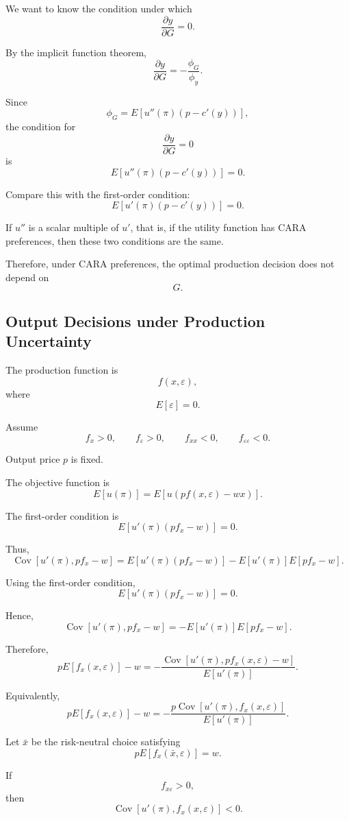 We want to know the condition under which
\[
\frac{\partial y}{\partial G}=0.
\]

By the implicit function theorem,
\[
\frac{\partial y}{\partial G}
=
-
\frac{\phi_G}{\phi_y}.
\]

Since
\[
\phi_G
=
E[u''(\pi)(p-c'(y))],
\]
the condition for
\[
\frac{\partial y}{\partial G}=0
\]
is
\[
E[u''(\pi)(p-c'(y))]=0.
\]

Compare this with the first-order condition:
\[
E[u'(\pi)(p-c'(y))]=0.
\]

If \(u''\) is a scalar multiple of \(u'\), that is, if the utility function has CARA preferences, then these two conditions are the same.

Therefore, under CARA preferences, the optimal production decision does not depend on
\[
G.
\]

\subsection{Output Decisions under Production Uncertainty}

The production function is
\[
f(x,\varepsilon),
\]
where
\[
E[\varepsilon]=0.
\]

Assume
\[
f_x>0,
\qquad
f_{\varepsilon}>0,
\qquad
f_{xx}<0,
\qquad
f_{\varepsilon\varepsilon}<0.
\]

Output price \(p\) is fixed.

The objective function is
\[
E[u(\pi)]
=
E[u(pf(x,\varepsilon)-wx)].
\]

The first-order condition is
\[
E[u'(\pi)(pf_x-w)]=0.
\]

Thus,
\[
\operatorname{Cov}[u'(\pi),pf_x-w]
=
E[u'(\pi)(pf_x-w)]
-
E[u'(\pi)]E[pf_x-w].
\]

Using the first-order condition,
\[
E[u'(\pi)(pf_x-w)]=0.
\]

Hence,
\[
\operatorname{Cov}[u'(\pi),pf_x-w]
=
-
E[u'(\pi)]E[pf_x-w].
\]

Therefore,
\[
pE[f_x(x,\varepsilon)]-w
=
-
\frac{
\operatorname{Cov}[u'(\pi),pf_x(x,\varepsilon)-w]
}{
E[u'(\pi)]
}.
\]

Equivalently,
\[
pE[f_x(x,\varepsilon)]-w
=
-
\frac{
p\operatorname{Cov}[u'(\pi),f_x(x,\varepsilon)]
}{
E[u'(\pi)]
}.
\]

Let \(\bar x\) be the risk-neutral choice satisfying
\[
pE[f_x(\bar x,\varepsilon)]=w.
\]

If
\[
f_{x\varepsilon}>0,
\]
then
\[
\operatorname{Cov}[u'(\pi),f_x(x,\varepsilon)]<0.
\]

